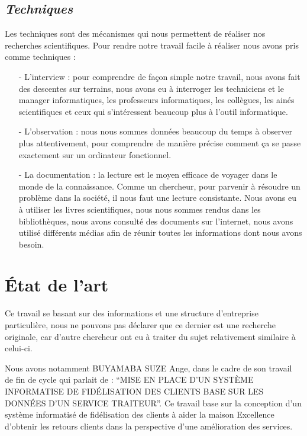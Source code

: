 \documentclass[a4paper,12pt,oneside]{book}
\begin{document}
        \subsection[Techniques]{\textit{Techniques}}
        Les techniques sont des mécanismes qui nous permettent de réaliser nos recherches
        scientifiques. Pour rendre notre travail facile à réaliser nous avons pris comme techniques : 
        \newline
        \begin{itemize}
            \item [-] L'interview : pour comprendre de façon simple notre travail, nous avons fait des
            descentes sur terrains, nous avons eu à interroger les techniciens et le manager
            informatiques, les professeurs informatiques, les collègues, les ainés scientifiques
            et ceux qui s’intéressent beaucoup plus à l’outil informatique.
            \newline
            \item [-] L'observation : nous nous sommes données beaucoup du temps à observer plus
            attentivement, pour comprendre de manière précise comment ça se passe exactement sur un ordinateur fonctionnel.
            \newline
            \item [-] La documentation : la lecture est le moyen efficace de voyager dans le monde
            de la connaissance. Comme un chercheur, pour parvenir à résoudre un problème
            dans la société, il nous faut une lecture consistante. Nous avons eu à utiliser les
            livres scientifiques, nous nous sommes rendus dans les bibliothèques, nous avons
            consulté des documents sur l’internet, nous avons utilisé différents médias afin de
            réunir toutes les informations dont nous avons besoin.
        \end{itemize}
        

    \section[Etat de l'art]{État de l’art}
    Ce travail se basant sur des informations et une structure d’entreprise particulière, nous ne
    pouvons pas déclarer que ce dernier est une recherche originale, car d’autre chercheur ont eu
    à traiter du sujet relativement similaire à celui-ci.
    \newline

    Nous avons notamment BUYAMABA SUZE Ange, dans le cadre de son travail de fin de cycle
    qui parlait de : \enquote{MISE EN PLACE D’UN SYSTÈME INFORMATISE DE FIDÉLISATION DES CLIENTS BASE SUR LES
    DONNÉES D’UN SERVICE TRAITEUR}. Ce travail base sur la conception d’un système informatisé de fidélisation des clients
    à aider la maison Excellence d’obtenir les retours clients dans la perspective d’une amélioration des services.\cite{Buyamba2017}
    \newline
\end{document}
